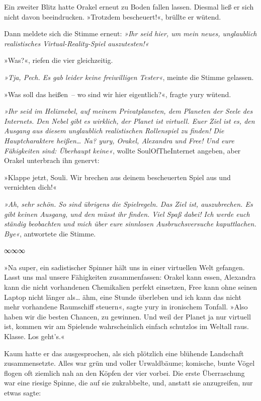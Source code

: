 Ein zweiter Blitz hatte Orakel erneut zu Boden fallen lassen. Diesmal ließ er sich nicht davon beeindrucken. »Trotzdem bescheuert!«, brüllte er wütend.

Dann meldete sich die Stimme erneut: \textit{»Ihr seid hier, um mein neues, unglaublich realistisches Virtual-Reality-Spiel auszutesten!«}

»Was?«, riefen die vier gleichzeitig.

\textit{»Tja, Pech. Es gab leider keine freiwilligen Tester«}, meinte die Stimme gelassen.

»Was soll das heißen~– wo sind wir hier eigentlich?«, fragte yury wütend.

\textit{»Ihr seid im Helixnebel, auf meinem Privatplaneten, dem Planeten der Seele des Internets. Den Nebel gibt es wirklich, der Planet ist virtuell. Euer Ziel ist es, den Ausgang aus diesem unglaublich realistischen Rollenspiel zu finden! Die Hauptcharaktere heißen… Na? yury, Orakel, Alexandra und Free! Und eure Fähigkeiten sind: Überhaupt keine«}, wollte SoulOfTheInternet angeben, aber Orakel unterbrach ihn genervt:

»Klappe jetzt, Souli. Wir brechen aus deinem bescheuerten Spiel aus und vernichten dich!«

\textit{»Ah, sehr schön. So sind übrigens die Spielregeln. Das Ziel ist, auszubrechen. Es gibt keinen Ausgang, und den müsst ihr finden. Viel Spaß dabei! Ich werde euch ständig beobachten und mich über eure sinnlosen Ausbruchsversuche kaputtlachen. Bye«}, antwortete die Stimme.

\begin{center}
    ∞∞∞
\end{center}

»Na super, ein sadistischer Spinner hält uns in einer virtuellen Welt gefangen. Lasst uns mal unsere Fähigkeiten zusammenfassen: Orakel kann essen, Alexandra kann die nicht vorhandenen Chemikalien perfekt einsetzen, Free kann ohne seinen Laptop nicht länger als… ähm, eine Stunde überleben und ich kann das nicht mehr vorhandene Raumschiff steuern«, sagte yury in ironischem Tonfall. »Also haben wir die besten Chancen, zu gewinnen. Und weil der Planet ja nur virtuell ist, kommen wir am Spielende wahrscheinlich einfach schutzlos im Weltall raus. Klasse. Los geht’s.«

Kaum hatte er das ausgesprochen, als sich plötzlich eine blühende Landschaft zusammensetzte. Alles war grün und voller Urwaldbäume; komische, bunte Vögel flogen oft ziemlich nah an den Köpfen der vier vorbei. Die erste Überraschung war eine riesige Spinne, die auf sie zukrabbelte, und, anstatt sie anzugreifen, nur etwas sagte:

